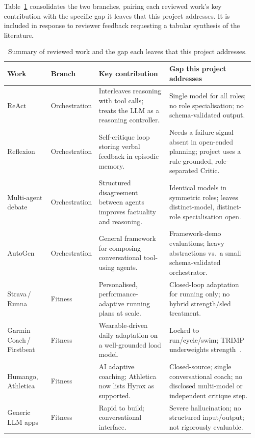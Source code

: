 Table~\ref{tab:litsummary} consolidates the two branches, pairing each reviewed work's key contribution with the specific gap it leaves that this project addresses. It is included in response to reviewer feedback requesting a tabular synthesis of the literature.

\begin{table}[H]
\centering
\footnotesize
\caption{Summary of reviewed work and the gap each leaves that this project addresses.}
\label{tab:litsummary}
\begin{tabular}{@{}p{2.3cm}p{1.4cm}p{4.3cm}p{4.6cm}@{}}
\toprule
\textbf{Work} & \textbf{Branch} & \textbf{Key contribution} & \textbf{Gap this project addresses} \\
\midrule
ReAct~\cite{yao2022react} & Orchestration & Interleaves reasoning with tool calls; treats the LLM as a reasoning controller. & Single model for all roles; no role specialisation; no schema-validated output. \\
Reflexion~\cite{shinn2023reflexion} & Orchestration & Self-critique loop storing verbal feedback in episodic memory. & Needs a failure signal absent in open-ended planning; project uses a rule-grounded, role-separated Critic. \\
Multi-agent debate~\cite{du2023debate} & Orchestration & Structured disagreement between agents improves factuality and reasoning. & Identical models in symmetric roles; leaves distinct-model, distinct-role specialisation open. \\
AutoGen~\cite{wu2023autogen} & Orchestration & General framework for composing conversational tool-using agents. & Framework-demo evaluations; heavy abstractions vs.\ a small schema-validated orchestrator. \\
Strava\,/\,Runna~\cite{strava_runna} & Fitness & Personalised, performance-adaptive running plans at scale. & Closed-loop adaptation for running only; no hybrid strength/sled treatment. \\
Garmin Coach\,/\,Firstbeat~\cite{firstbeat_whitepaper} & Fitness & Wearable-driven daily adaptation on a well-grounded load model. & Locked to run/cycle/swim; TRIMP underweights strength~\cite{strength_load_critique}. \\
Humango, Athletica~\cite{humango,athletica} & Fitness & AI adaptive coaching; Athletica now lists Hyrox as supported. & Closed-source; single conversational coach; no disclosed multi-model or independent critique step. \\
Generic LLM apps~\cite{huang2023hallucination} & Fitness & Rapid to build; conversational interface. & Severe hallucination; no structured input/output; not rigorously evaluable. \\
\bottomrule
\end{tabular}
\end{table}

